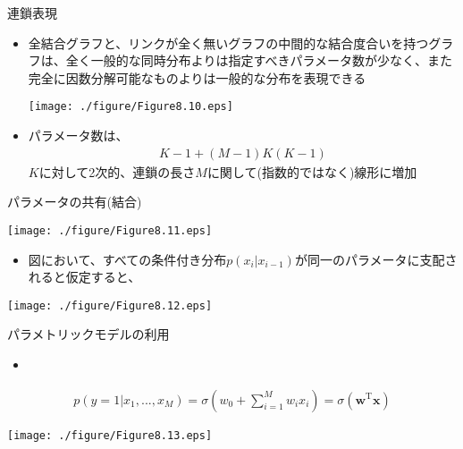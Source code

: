  \begin{frame}{連鎖表現}
  \begin{itemize}
   \item 全結合グラフと、リンクが全く無いグラフの中間的な結合度合いを持つグラフは、全く一般的な同時分布よりは指定すべきパラメータ数が少なく、また完全に因数分解可能なものよりは一般的な分布を表現できる
         \begin{center}
          \texttt{[image: ./figure/Figure8.10.eps]}
         \end{center}

   \item パラメータ数は、
         \begin{eqnarray*}
          K - 1 + (M-1)K(K-1)
         \end{eqnarray*}
         $K$に対して2次的、連鎖の長さ$M$に関して(指数的ではなく)線形に増加
  \end{itemize}
 \end{frame}

 \begin{frame}{パラメータの共有(結合)}
  \begin{center}
   \texttt{[image: ./figure/Figure8.11.eps]}
  \end{center}
  \begin{itemize}
   \item 図において、すべての条件付き分布$p(x_i|x_{i-1})$が同一のパラメータに支配されると仮定すると、
  \end{itemize}
  \begin{center}
   \texttt{[image: ./figure/Figure8.12.eps]}
  \end{center}
 \end{frame}

 \begin{frame}{パラメトリックモデルの利用}
  \begin{itemize}
   \item %
  \end{itemize}
  \begin{eqnarray*}
   p(y=1|x_1,...,x_M) = \sigma \left( w_0 + \sum_{i=1}^{M}w_ix_i\right) = \sigma (\bm{w}^{\mathrm{T}}\bm{x})
  \end{eqnarray*}
  \begin{center}
   \texttt{[image: ./figure/Figure8.13.eps]}
  \end{center}
 \end{frame}


